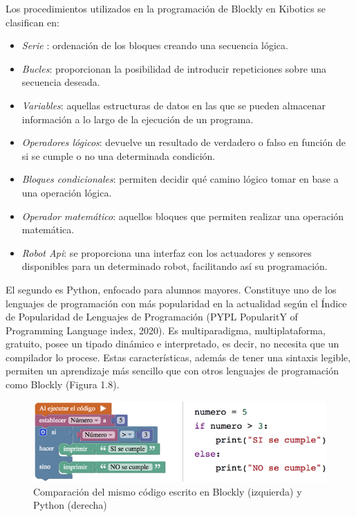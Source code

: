 \documentclass{report}
\begin{document}
Los procedimientos utilizados en la programación de Blockly en Kibotics se clasifican en:
\begin{itemize}
	\item \textit{Serie} : ordenación de los bloques creando una secuencia lógica.

	\item \textit{Bucles}: proporcionan la posibilidad de introducir repeticiones sobre una secuencia deseada.
		
	\item \textit{Variables}: aquellas estructuras de datos en las que se pueden almacenar información a lo largo de la ejecución de un programa.
	
	\item \textit{Operadores lógicos}: devuelve un resultado de verdadero o falso en función de si se cumple o no una determinada condición.
	
	\item \textit{Bloques condicionales}: permiten decidir qué camino lógico tomar en base a una operación lógica.
	
	\item \textit{Operador matemático}: aquellos bloques que permiten realizar una operación matemática.
	
	\item \textit{Robot Api}: se proporciona una interfaz con los actuadores y sensores disponibles para un determinado robot, facilitando así su programación.
\end{itemize}

El segundo es Python, enfocado para alumnos mayores. Constituye uno de los lenguajes de programación con más popularidad en la actualidad según el Índice de Popularidad de Lenguajes de Programación (PYPL PopularitY of Programming Language index, 2020). Es multiparadigma, multiplataforma, gratuito, posee un tipado dinámico e interpretado, es decir, no necesita que un compilador lo procese. Estas características, además de tener una sintaxis legible, permiten un aprendizaje más sencillo que con otros lenguajes de programación como Blockly (Figura 1.8).
\\
\begin{figure}[h!]
  \centering
    \includegraphics[width=1\textwidth]{images/blockly-vs-python.png}
  \caption{Comparación del mismo código escrito en Blockly (izquierda) y Python (derecha)}
  \label{Comparación del mismo código escrito en Blockly y Python}
\end{figure}
\\
\end{document}
